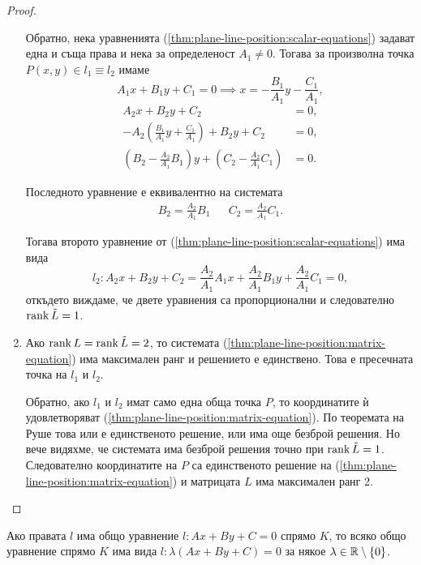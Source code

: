 \documentclass[numbers=endperiod, DIV=15]{scrartcl}
\begin{document}
\begin{proof}
\begin{enumerate}
    Обратно, нека уравненията (\ref{thm:plane-line-position:scalar-equations}) задават една и съща права и нека за определеност $A_1 \neq 0$. Тогава за произволна точка $P(x, y) \in l_1 \equiv l_2$ имаме
    \begin{displaymath}
      A_1x + B_1y + C_1 = 0
      \implies
      x = - \frac {B_1} {A_1} y - \frac {C_1} {A_1},
    \end{displaymath}
    \begin{align*}
      A_2x + B_2y + C_2 &= 0,
      \\
      - A_2 \left(\frac {B_1} {A_1} y + \frac {C_1} {A_1} \right) + B_2y + C_2 &= 0,
      \\
      \left(B_2 - \frac {A_2} {A_1} B_1 \right) y + \left(C_2 - \frac {A_2} {A_1} C_1 \right) &= 0.
    \end{align*}

    Последното уравнение е еквивалентно на системата
    \begin{align*}
      B_2 = \frac {A_2} {A_1} B_1
      &&
      C_2 = \frac {A_2} {A_1} C_1.
    \end{align*}

    Тогава второто уравнение от (\ref{thm:plane-line-position:scalar-equations}) има вида
    \begin{displaymath}
      l_2:
      A_2 x + B_2 y + C_2 =
      \frac {A_2} {A_1} A_1 x + \frac {A_2} {A_1} B_1 y + \frac {A_2} {A_1} C_1
      = 0,
    \end{displaymath}
    откъдето виждаме, че двете уравнения са пропорционални и следователно $\operatorname{rank} \tilde L = 1$.

    \item Ако $\operatorname{rank} L = \operatorname{rank} \tilde L = 2$, то системата (\ref{thm:plane-line-position:matrix-equation}) има максимален ранг и решението е единствено. Това е пресечната точка на $l_1$ и $l_2$.

    Обратно, ако $l_1$ и $l_2$ имат само една обща точка $P$, то координатите ѝ удовлетворяват (\ref{thm:plane-line-position:matrix-equation}). По теоремата на Руше това или е единственото решение, или има още безброй решения. Но вече видяхме, че системата има безброй решения точно при $\operatorname{rank} \tilde L = 1$. Следователно координатите на $P$ са единственото решение на (\ref{thm:plane-line-position:matrix-equation}) и матрицата $L$ има максимален ранг 2.
  \end{enumerate}
\end{proof}

\begin{corollary}
  Ако правата $l$ има общо уравнение $l: Ax + By + C = 0$ спрямо $K$, то всяко общо уравнение спрямо $K$ има вида $l: \lambda(Ax + By + C) = 0$ за някое $\lambda \in \mathbb{R} \setminus \{ 0 \}$.
\end{corollary}
\end{document}
